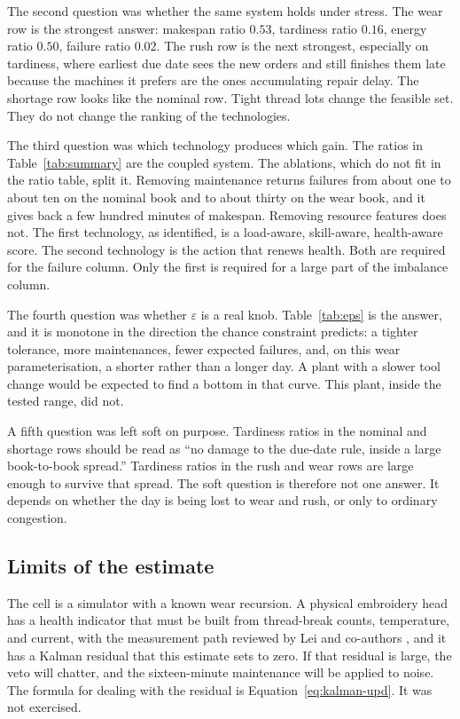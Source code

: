 The second question was whether the same system holds under stress. The wear row is the strongest answer: makespan ratio \(0.53\), tardiness ratio \(0.16\), energy ratio \(0.50\), failure ratio \(0.02\). The rush row is the next strongest, especially on tardiness, where earliest due date sees the new orders and still finishes them late because the machines it prefers are the ones accumulating repair delay. The shortage row looks like the nominal row. Tight thread lots change the feasible set. They do not change the ranking of the technologies.

The third question was which technology produces which gain. The ratios in Table~\ref{tab:summary} are the coupled system. The ablations, which do not fit in the ratio table, split it. Removing maintenance returns failures from about one to about ten on the nominal book and to about thirty on the wear book, and it gives back a few hundred minutes of makespan. Removing resource features does not. The first technology, as identified, is a load-aware, skill-aware, health-aware score. The second technology is the action that renews health. Both are required for the failure column. Only the first is required for a large part of the imbalance column.

The fourth question was whether \(\varepsilon\) is a real knob. Table~\ref{tab:eps} is the answer, and it is monotone in the direction the chance constraint predicts: a tighter tolerance, more maintenances, fewer expected failures, and, on this wear parameterisation, a shorter rather than a longer day. A plant with a slower tool change would be expected to find a bottom in that curve. This plant, inside the tested range, did not.

A fifth question was left soft on purpose. Tardiness ratios in the nominal and shortage rows should be read as ``no damage to the due-date rule, inside a large book-to-book spread.'' Tardiness ratios in the rush and wear rows are large enough to survive that spread. The soft question is therefore not one answer. It depends on whether the day is being lost to wear and rush, or only to ordinary congestion.

\subsection{Limits of the estimate}

The cell is a simulator with a known wear recursion. A physical embroidery head has a health indicator that must be built from thread-break counts, temperature, and current, with the measurement path reviewed by Lei and co-authors \cite{lei2018}, and it has a Kalman residual that this estimate sets to zero. If that residual is large, the veto will chatter, and the sixteen-minute maintenance will be applied to noise. The formula for dealing with the residual is Equation~\eqref{eq:kalman-upd}. It was not exercised.

